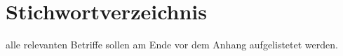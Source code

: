 \section{Stichwortverzeichnis}
alle relevanten Betriffe sollen am Ende vor dem Anhang aufgelistetet werden.
